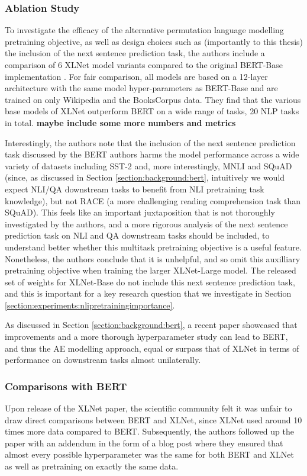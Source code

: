 {{\subsubsection{Ablation Study}
To investigate the efficacy of the alternative permutation language modelling pretraining objective, as well as design choices such as (importantly to this thesis) the inclusion of the next sentence prediction task, the authors include a comparison of 6 XLNet model variants compared to the original BERT-Base implementation \cite{Devlin2018}. For fair comparison, all models are based on a 12-layer architecture with the same model hyper-parameters as BERT-Base and are trained on only Wikipedia and the BooksCorpus data. They find that the various base models of XLNet outperform BERT on a wide range of tasks, 20 NLP tasks in total. \textbf{maybe include some more numbers and metrics}

Interestingly, the authors note that the inclusion of the next sentence prediction task discussed by the BERT authors harms the model performance across a wide variety of datasets including SST-2 and, more interestingly, MNLI and SQuAD (since, as discussed in Section \ref{section:background:bert}, intuitively we would expect NLI/QA downstream tasks to benefit from NLI pretraining task knowledge), but not RACE (a more challenging reading comprehension task than SQuAD). This feels like an important juxtaposition that is not thoroughly investigated by the authors, and a more rigorous analysis of the next sentence prediction task on NLI and QA downstream tasks should be included, to understand better whether this multitask pretraining objective is a useful feature. Nonetheless, the authors conclude that it is unhelpful, and so omit this auxilliary pretraining objective when training the larger XLNet-Large model. The released set of weights for XLNet-Base do not include this next sentence prediction task, and this is important for a key research question that we investigate in Section \ref{section:experiments:nlipretrainingimportance}.

As discussed in Section \ref{section:background:bert}, a recent paper \cite{Liu2019} showcased that improvements and a more thorough hyperparameter study can lead to BERT, and thus the AE modelling approach, equal or surpass that of XLNet in terms of performance on downstream tasks almost unilaterally.

\subsubsection{Comparisons with BERT}
Upon release of the XLNet paper, the scientific community felt it was unfair to draw direct comparisons between BERT and XLNet, since XLNet used around 10 times more data compared to BERT. Subsequently, the authors followed up the paper with an addendum in the form of a blog post \cite{XLNetTeam2019} where they ensured that almost every possible hyperparameter was the same for both BERT and XLNet as well as pretraining on exactly the same data. 

}}
